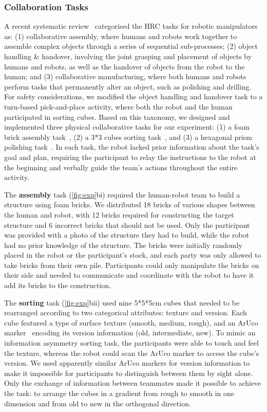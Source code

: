 \subsubsection{Collaboration Tasks}
A recent systematic review~\cite{semeraro2023human} categorised the HRC tasks for robotic manipulators as: (1) collaborative assembly, where humans and robots work together to assemble complex objects through a series of sequential sub-processes; (2) object handling \& handover, involving the joint grasping and placement of objects by humans and robots, as well as the handover of objects from the robot to the human; and (3) collaborative manufacturing, where both humans and robots perform tasks that permanently alter an object, such as polishing and drilling. For safety considerations, we modified the object handling and handover task to a turn-based pick-and-place activity, where both the robot and the human participated in sorting cubes. Based on this taxonomy, we designed and implemented three physical collaborative tasks for our experiment: (1) a foam brick assembly task~\cite{vogt2016learning}, (2) a 3*3 cubes sorting task~\cite{faroni2020layered}, and (3) a hexagonal prism polishing task~\cite{nikolaidis2015efficient}. 
In each task, the robot lacked prior information about the task's goal and plan, requiring the participant to relay the instructions to the robot at the beginning and verbally guide the team's actions throughout the entire activity.

The \textbf{assembly} task (\autoref{fig:exp}bi) required the human-robot team to build a structure using foam bricks. We distributed 18 bricks of various shapes between the human and robot, with 12 bricks required for constructing the target structure and 6 incorrect bricks that should not be used.  
Only the participant was provided with a photo of the structure they had to build, while the robot had no prior knowledge of the structure. The bricks were initially randomly placed in the robot or the participant's stock, and each party was only allowed to take bricks from their own pile. 
Participants could only manipulate the bricks on their side and needed to communicate and coordinate with the robot to have it add its bricks to the construction. 

The \textbf{sorting} task (\autoref{fig:exp}bii) used nine 5*5*5cm cubes that needed to be rearranged according to two categorical attributes: texture and version.  Each cube featured a type of surface texture (smooth, medium, rough), and an ArUco marker~\cite{garrido2014automatic} encoding its version information (old, intermediate, new). 
To mimic an information asymmetry sorting task, the participants were able to touch and feel the texture, whereas the robot could scan the ArUco marker to access the cube's version.
We used apparently similar ArUco markers for version information to make it impossible for participants to distinguish between them by sight alone. Only the exchange of information between teammates made it possible to achieve the task: to arrange the cubes in a gradient from rough to smooth in one dimension and from old to new in the orthogonal direction. 

